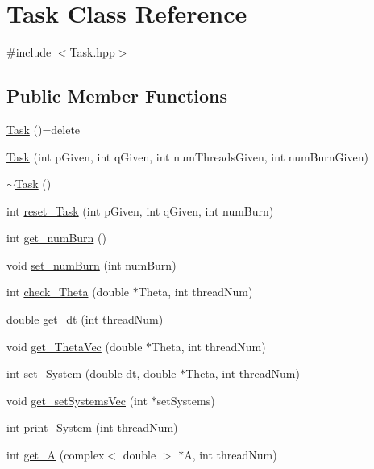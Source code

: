 \hypertarget{class_task}{\section{Task Class Reference}
\label{class_task}
}


{\ttfamily \#include $<$Task.\-hpp$>$}

\subsection*{Public Member Functions}
\begin{DoxyCompactItemize}
\item 
\hyperlink{class_task_a566e792c22b9a02dd018246dfd4f2c8c}{Task} ()=delete
\item 
\hyperlink{class_task_ae64b05231261ab364ebb22e17f17749d}{Task} (int p\-Given, int q\-Given, int num\-Threads\-Given, int num\-Burn\-Given)
\item 
\hyperlink{class_task_a3ecf499ea35fb4a96853969a1e1cbbce}{$\sim$\-Task} ()
\item 
int \hyperlink{class_task_a57acc41093d637b76445e8c3b0c16d85}{reset\-\_\-\-Task} (int p\-Given, int q\-Given, int num\-Burn)
\item 
int \hyperlink{class_task_ad8e737c998840996dac1618f78bd30f8}{get\-\_\-num\-Burn} ()
\item 
void \hyperlink{class_task_a957aca6b2ed739372947eec535a152f0}{set\-\_\-num\-Burn} (int num\-Burn)
\item 
int \hyperlink{class_task_a41f8fe9b59b4646004130845d7c6b23c}{check\-\_\-\-Theta} (double $\ast$Theta, int thread\-Num)
\item 
double \hyperlink{class_task_a5d98307b92b46ba1b5e86e766414b3ac}{get\-\_\-dt} (int thread\-Num)
\item 
void \hyperlink{class_task_acc99a8a705981e3b7a84f0a0ee896c80}{get\-\_\-\-Theta\-Vec} (double $\ast$Theta, int thread\-Num)
\item 
int \hyperlink{class_task_a3a96c9759fc036506571a1374aa0e79c}{set\-\_\-\-System} (double dt, double $\ast$Theta, int thread\-Num)
\item 
void \hyperlink{class_task_aa841a5c8cf5accf00d3b9717e493bf1d}{get\-\_\-set\-Systems\-Vec} (int $\ast$set\-Systems)
\item 
int \hyperlink{class_task_a29f9ab809fb5692ae2fd8814815f8b64}{print\-\_\-\-System} (int thread\-Num)
\item 
int \hyperlink{class_task_a31db79de0a756c47b7211af91639306b}{get\-\_\-\-A} (complex$<$ double $>$ $\ast$A, int thread\-Num)

\end{DoxyCompactItemize}
